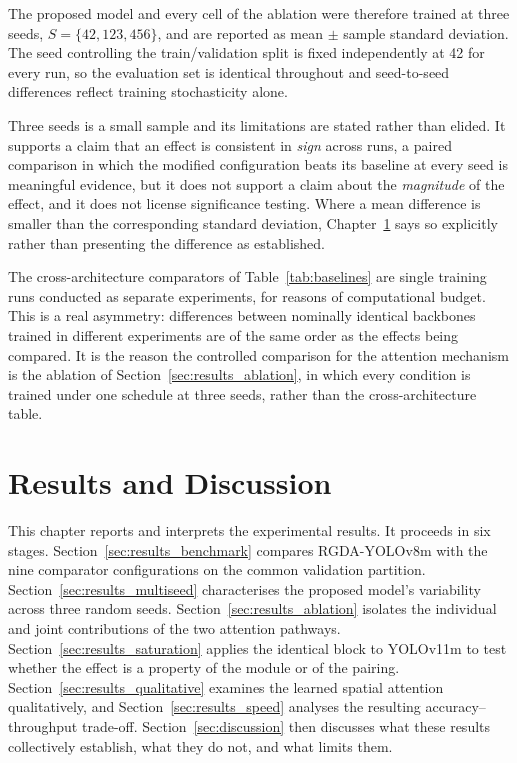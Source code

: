 \documentclass[MScCS]{uccthesis}
\begin{document}
The proposed model and every cell of the ablation were therefore trained at
three seeds, $S = \{42, 123, 456\}$, and are reported as mean $\pm$ sample
standard deviation. The seed controlling the train/validation split is fixed
independently at 42 for every run, so the evaluation set is identical
throughout and seed-to-seed differences reflect training stochasticity alone.

Three seeds is a small sample and its limitations are stated rather than
elided. It supports a claim that an effect is consistent in \emph{sign} across
runs, a paired comparison in which the modified configuration beats its
baseline at every seed is meaningful evidence, but it does not support a
claim about the \emph{magnitude} of the effect, and it does not license
significance testing. Where a mean difference is smaller than the corresponding
standard deviation, Chapter~\ref{ch:results} says so explicitly rather than
presenting the difference as established.

The cross-architecture comparators of Table~\ref{tab:baselines} are single
training runs conducted as separate experiments, for reasons of computational
budget. This is a real asymmetry: differences between nominally identical
backbones trained in different experiments are of the same order as the effects
being compared. It is the reason the controlled comparison for the attention
mechanism is the ablation of Section~\ref{sec:results_ablation}, in which every
condition is trained under one schedule at three seeds, rather than the
cross-architecture table.



\chapter{Results and Discussion}
\label{ch:results}

This chapter reports and interprets the experimental results. It proceeds in
six stages. Section~\ref{sec:results_benchmark} compares RGDA-YOLOv8m with the
nine comparator configurations on the common validation partition.
Section~\ref{sec:results_multiseed} characterises the proposed model's
variability across three random seeds.
Section~\ref{sec:results_ablation} isolates the individual and joint
contributions of the two attention pathways.
Section~\ref{sec:results_saturation} applies the identical block to YOLOv11m to
test whether the effect is a property of the module or of the pairing.
Section~\ref{sec:results_qualitative} examines the learned spatial attention
qualitatively, and Section~\ref{sec:results_speed} analyses the resulting
accuracy--throughput trade-off. Section~\ref{sec:discussion} then discusses what
these results collectively establish, what they do not, and what limits them.
\end{document}
